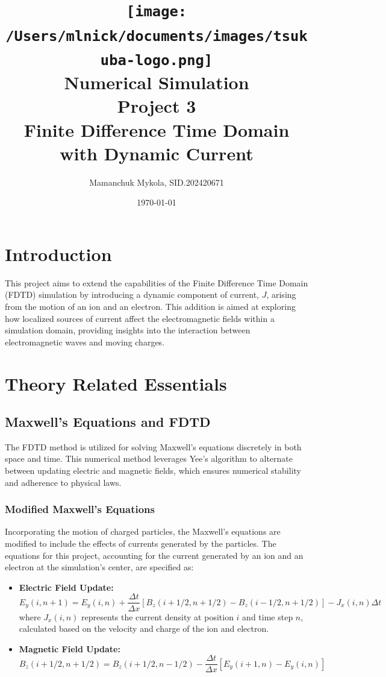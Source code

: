 \documentclass{article}[a4paper]
\title{
    \texttt{[image: /Users/mlnick/documents/images/tsukuba-logo.png]} \\
    \vspace{2mm}
    \textbf{Numerical Simulation} \\
    \vspace{3mm}    
    Project 3 \\
    Finite Difference Time Domain with Dynamic Current
}
\author{Mamanchuk Mykola, SID.202420671}
\date{\today}
\begin{document}
\maketitle

\section{Introduction}

This project aims to extend the capabilities of the Finite Difference Time Domain (FDTD) simulation by introducing a dynamic component of current, \( J \), arising from the motion of an ion and an electron. This addition is aimed at exploring how localized sources of current affect the electromagnetic fields within a simulation domain, providing insights into the interaction between electromagnetic waves and moving charges.

\section{Theory Related Essentials}

\subsection{Maxwell's Equations and FDTD}

The FDTD method is utilized for solving Maxwell's equations discretely in both space and time. This numerical method leverages Yee's algorithm to alternate between updating electric and magnetic fields, which ensures numerical stability and adherence to physical laws.

\subsubsection{Modified Maxwell's Equations}

Incorporating the motion of charged particles, the Maxwell's equations are modified to include the effects of currents generated by the particles. The equations for this project, accounting for the current generated by an ion and an electron at the simulation's center, are specified as:

\begin{itemize}
    \item \textbf{Electric Field Update:}
    \[
    E_y(i, n + 1) = E_y(i, n) + \frac{\Delta t}{\Delta x} \left[ B_z(i + 1/2, n + 1/2) - B_z(i - 1/2, n + 1/2) \right] - J_x(i, n)\Delta t
    \]
    where \( J_x(i, n) \) represents the current density at position \( i \) and time step \( n \), calculated based on the velocity and charge of the ion and electron.
    
    \item \textbf{Magnetic Field Update:}
    \[
    B_z(i + 1/2, n + 1/2) = B_z(i + 1/2, n - 1/2) - \frac{\Delta t}{\Delta x} \left[ E_y(i + 1, n) - E_y(i, n) \right]
    \]
\end{itemize}
\end{document}
